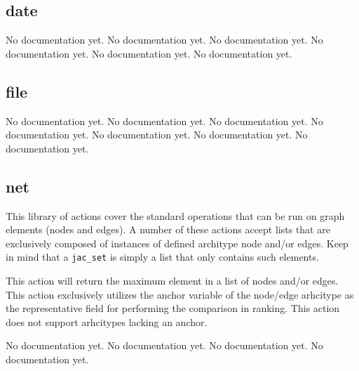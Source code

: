 \subsection{date}
\par
No documentation yet.
{No documentation yet.}
{No documentation yet.}
{No documentation yet.}
{No documentation yet.}
{No documentation yet.}
\subsection{file}
\par
No documentation yet.
{No documentation yet.}
{No documentation yet.}
{No documentation yet.}
{No documentation yet.}
{No documentation yet.}
{No documentation yet.}
\subsection{net}
\par
This library of actions cover the standard operations that can be
run on graph elements (nodes and edges). A number of these actions
accept lists that are exclusively composed of instances of defined
architype node and/or edges. Keep in mind that a \lstinline{jac_set}
is simply a list that only contains such elements.
{This action will return the maximum element in a list of nodes
and/or edges. This action exclusively utilizes the anchor variable
of the node/edge arhcitype as the representative field for
performing the  comparison in ranking. This action does not support
arhcitypes lacking an anchor.\vspace{4mm}\par
{}\vspace{4mm}\par
{}}
{No documentation yet.}
{No documentation yet.}
{No documentation yet.}
{No documentation yet.}
